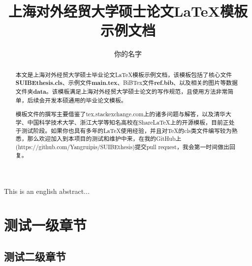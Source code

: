 \documentclass{SUIBEthesis}
\begin{document}
\title{上海对外经贸大学硕士论文\LaTeX 模板示例文档}
\author{你的名字}


\maketitle

\newpage

\begin{abstract}
  
  本文是上海对外经贸大学硕士毕业论文\LaTeX 模板示例文档，该模板包括了核心文件\textbf{SUIBEthesis.cls}、示例文件\textbf{main.tex}、BiBTex文件\textbf{ref.bib}、以及相关的图片等数据文件夹\textbf{data}。该模板满足上海对外经贸大学硕士论文的写作规范，且使用方法非常简单，后续会开发本硕通用的毕业论文模板。

  模板文件的撰写主要借鉴了tex.stackexchange.com上的诸多问题与解答，以及清华大学、中国科学技术大学、浙江大学等知名高校在ShareLaTeX上的开源模板，目前正处于测试阶段。如果你也具有多年的\LaTeX 使用经验，并且对\TeX 的cls类文件编写较为熟悉，那么欢迎加入到本项目的测试和维护中来，在我的GitHub上(https://github.com/Yangruipis/SUIBEthesis)提交pull request，我会第一时间做出回复。

  
  
\end{abstract}


\newpage
\begin{enabstract}
  
\end{enabstract}

This is an english abstract...



\newpage
\pagestyle{empty}
\tableofcontents
\pagestyle{empty}
\thispagestyle{coverpage}


\newpage
\setcounter{page}{1}
\pagestyle{mainpage}


\section{测试一级章节}
\subsection{测试二级章节}
\end{document}
